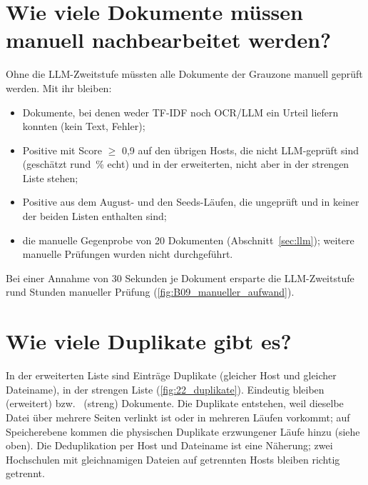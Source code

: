 \section{Wie viele Dokumente müssen manuell nachbearbeitet werden?}
Ohne die LLM-Zweitstufe müssten alle Dokumente der Grauzone manuell geprüft werden. Mit ihr bleiben:
\begin{itemize}
  \item \zUnresolved{} Dokumente, bei denen weder TF-IDF noch OCR/LLM ein Urteil liefern konnten (kein Text, Fehler);
  \item \zTfidfHigh{} Positive mit Score $\ge$ 0,9 auf den übrigen Hosts, die nicht LLM-geprüft sind (geschätzt rund \zNonSuspectPct\,\% echt) und in der erweiterten, nicht aber in der strengen Liste stehen;
  \item \zTfidfOther{} Positive aus dem August- und den Seeds-Läufen, die ungeprüft und in keiner der beiden Listen enthalten sind;
  \item die manuelle Gegenprobe von 20 Dokumenten (Abschnitt~\ref{sec:llm}); weitere manuelle Prüfungen wurden nicht durchgeführt.
\end{itemize}
Bei einer Annahme von 30 Sekunden je Dokument ersparte die LLM-Zweitstufe rund \zManuellOhneH{} Stunden manueller Prüfung (\cref{fig:B09_manueller_aufwand}).


\section{Wie viele Duplikate gibt es?}
In der erweiterten Liste sind \zDupLikely{} Einträge Duplikate (gleicher Host und gleicher Dateiname), in der strengen Liste \zDupStrict{} (\cref{fig:22_duplikate}). Eindeutig bleiben \zUniqueLikely{} (erweitert) bzw.\ \zUniqueStrict{} (streng) Dokumente. Die Duplikate entstehen, weil dieselbe Datei über mehrere Seiten verlinkt ist oder in mehreren Läufen vorkommt; auf Speicherebene kommen die physischen Duplikate erzwungener Läufe hinzu (siehe oben). Die Deduplikation per Host und Dateiname ist eine Näherung; zwei Hochschulen mit gleichnamigen Dateien auf getrennten Hosts bleiben richtig getrennt.



